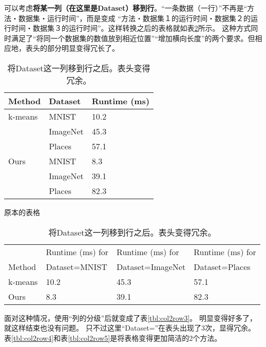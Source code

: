 \documentclass{article}
\newcommand{\Tref}[1]{表\ref{#1}}
\begin{document}
可以考虑\textbf{将某一列（在这里是Dataset）移到行}。“一条数据（一行）”不再是“方法・数据集・运行时间”，而是变成
“方法・数据集１的运行时间・数据集２的运行时间・数据集３的运行时间”。这样转换之后的表格就如\Tref{tbl:col2row2}所示。
这种方式同时满足了“将同一个数据集的数值放到相近位置”“增加横向长度”的两个要求。但相应地，表头的部分明显变得冗长了。

\begin{table}[h]
    \begin{minipage}{0.32\linewidth}
        \centering
        \begin{tabular}{@{}lll@{}} \toprule
            Method & Dataset & Runtime (ms) \\ \midrule
            k-means   & MNIST    & 10.2 \\ 
                      & ImageNet & 45.3 \\ 
                      & Places   & 57.1 \\ 
            Ours      & MNIST    & 8.3 \\ 
                      & ImageNet & 39.1 \\ 
                      & Places   & 82.3 \\ \bottomrule   
        \end{tabular}
        \caption{原本的表格}
        \label{tbl:col2row1}
    \end{minipage}
    \hfill
    \begin{minipage}{0.67\linewidth}
        \centering
        \begin{tabular}{@{}llll@{}} \toprule
                   & Runtime (ms) for & Runtime (ms) for & Runtime (ms) for         \\
            Method & Dataset=MNIST & Dataset=ImageNet & Dataset=Places \\ \midrule
            k-means   & 10.2 & 45.3 & 57.1 \\ 
            Ours      & 8.3  & 39.1 & 82.3 \\ \bottomrule   
        \end{tabular}
        \caption{将Dataset这一列移到行之后。表头变得冗余。}
        \label{tbl:col2row2}
    \end{minipage}
\end{table}

面对这种情况，使用“列的分级”后就变成了\Tref{tbl:col2row3}。
明显变得好多了，就这样结束也没有问题。
只不过这里“Dataset=”在表头出现了3次，显得冗余。
\Tref{tbl:col2row4}和\Tref{tbl:col2row5}是将表格变得更加简洁的2个方法。
\end{document}
